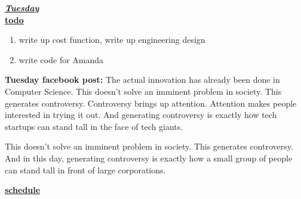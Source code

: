 \underline{\textbf{\textit{Tuesday}}}\\
\underline{\textbf{todo}}\\
\begin{enumerate}
\item write up cost function, write up engineering design 
\item write code for Amanda
\end{enumerate}

\textbf{Tuesday facebook post: } The actual innovation has already been done in Computer Science.
This doesn't solve an imminent problem in society. This generates controversy.
Controversy brings up attention. Attention makes people interested in trying it out.
And generating controversy is exactly how tech startups can stand tall in the face of tech giants.

This doesn't solve an imminent problem in society.
This generates controversy. And in this day, generating controversy is exactly how a small group of people can stand tall
in front of large corporations.

\underline{\textbf{schedule}}\\
\begin{itemize}
\end{itemize}


